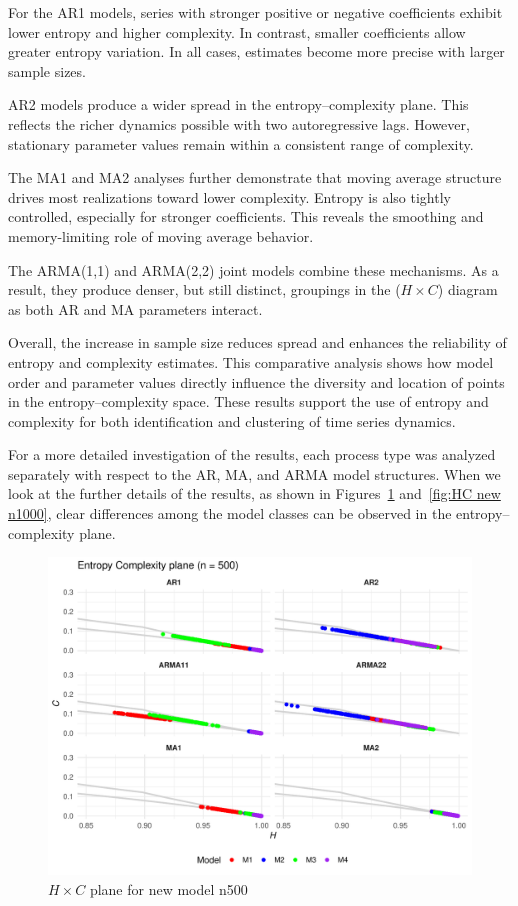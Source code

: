 \documentclass[12pt,a4paper]{article}
\begin{document}
For the AR1 models, series with stronger positive or negative coefficients exhibit lower entropy and higher complexity. In contrast, smaller coefficients allow greater entropy variation. In all cases, estimates become more precise with larger sample sizes.

AR2 models produce a wider spread in the entropy–complexity plane. This reflects the richer dynamics possible with two autoregressive lags. However, stationary parameter values remain within a consistent range of complexity.

The MA1 and MA2 analyses further demonstrate that moving average structure drives most realizations toward lower complexity. Entropy is also tightly controlled, especially for stronger coefficients. This reveals the smoothing and memory-limiting role of moving average behavior.

The ARMA(1,1) and ARMA(2,2) joint models combine these mechanisms. As a result, they produce denser, but still distinct, groupings in the ($H \times C$) diagram as both AR and MA parameters interact.

Overall, the increase in sample size reduces spread and enhances the reliability of entropy and complexity estimates. This comparative analysis shows how model order and parameter values directly influence the diversity and location of points in the entropy–complexity space. These results support the use of entropy and complexity for both identification and clustering of time series dynamics.

For a more detailed investigation of the results, each process type was analyzed separately with respect to the AR, MA, and ARMA model structures. When we look at the further details of the results, as shown in Figures~\ref{fig:HC new n500} and~\ref{fig:HC new n1000}, clear differences among the model classes can be observed in the entropy–complexity plane.

\begin{figure}[H]
	\includegraphics[width=0.9 \textwidth]{New_model_group_plot_n500}
	\caption{$H \times C$ plane for new model n500}
	\label{fig:HC new n500}
\end{figure}
\end{document}
